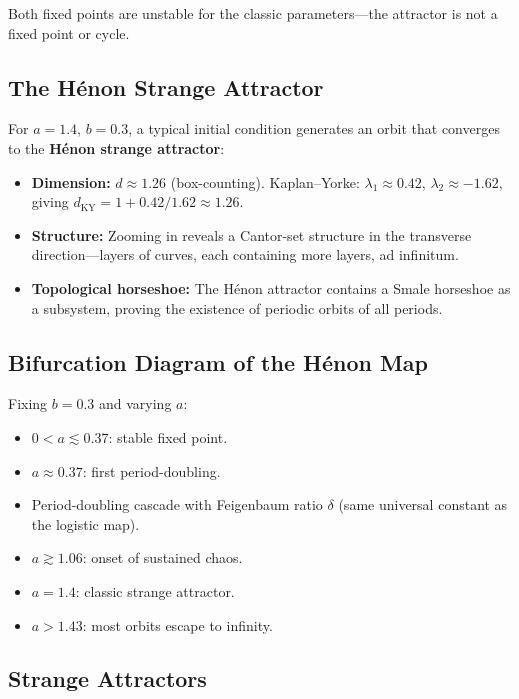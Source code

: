 \documentclass[11pt,letterpaper]{article}
\theoremstyle{definition}
\theoremstyle{plain}
\theoremstyle{remark}
\begin{document}
Both fixed points are unstable for the classic parameters---the attractor
is not a fixed point or cycle.

\subsection{The H\'enon Strange Attractor}

For $a=1.4$, $b=0.3$, a typical initial condition generates an orbit that
converges to the \textbf{H\'enon strange attractor}:
\begin{itemize}[leftmargin=2em]
  \item \textbf{Dimension:} $d \approx 1.26$ (box-counting).
    Kaplan--Yorke: $\lambda_1 \approx 0.42$, $\lambda_2 \approx -1.62$,
    giving $d_{\mathrm{KY}} = 1 + 0.42/1.62 \approx 1.26$.
  \item \textbf{Structure:} Zooming in reveals a Cantor-set structure
    in the transverse direction---layers of curves, each containing
    more layers, ad infinitum.
  \item \textbf{Topological horseshoe:} The H\'enon attractor contains
    a Smale horseshoe as a subsystem, proving the existence of periodic
    orbits of all periods.
\end{itemize}

\subsection{Bifurcation Diagram of the H\'enon Map}

Fixing $b=0.3$ and varying $a$:
\begin{itemize}[leftmargin=2em]
  \item $0 < a \lesssim 0.37$: stable fixed point.
  \item $a \approx 0.37$: first period-doubling.
  \item Period-doubling cascade with Feigenbaum ratio $\delta$ (same
    universal constant as the logistic map).
  \item $a \gtrsim 1.06$: onset of sustained chaos.
  \item $a = 1.4$: classic strange attractor.
  \item $a > 1.43$: most orbits escape to infinity.
\end{itemize}

\subsection{Strange Attractors}
\end{document}
